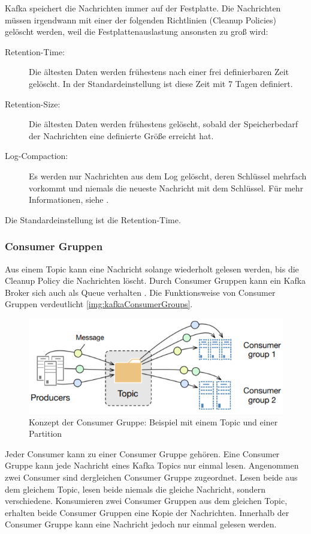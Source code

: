\documentclass[a4paper,titlepage,halfparskip,12pt]{scrreprt}
\begin{document}
\begin{onehalfspacing}
Kafka speichert die Nachrichten immer auf der Festplatte. Die Nachrichten müssen irgendwann mit einer der folgenden Richtlinien (Cleanup Policies) \cite{berleKafkaOverview} gelöscht werden, weil die Festplattenauslastung ansonsten zu groß wird:

\begin{description}
\item[Retention-Time:] Die ältesten Daten werden frühestens nach einer frei definierbaren Zeit gelöscht. In der Standardeinstellung ist diese Zeit mit 7 Tagen definiert.
\item[Retention-Size:] Die ältesten Daten werden frühestens gelöscht, sobald der Speicherbedarf der Nachrichten eine definierte Größe erreicht hat.
\item[Log-Compaction:] Es werden nur Nachrichten aus dem Log gelöscht, deren Schlüssel mehrfach vorkommt und niemals die neueste Nachricht mit dem Schlüssel. Für mehr Informationen, siehe \cite{kafkaLogCompaction}.
\end{description}

Die Standardeinstellung ist die Retention-Time.

\subsubsection*{Consumer Gruppen}

Aus einem Topic kann eine Nachricht solange wiederholt gelesen werden, bis die Cleanup Policy die Nachrichten löscht. Durch Consumer Gruppen kann ein Kafka Broker sich auch als Queue verhalten \cite{nannoniDissKafka}. Die Funktionsweise von Consumer Gruppen verdeutlicht \autoref{img:kafkaConsumerGroups}.

\begin{figure}[h]
	\centering
	\includegraphics[width=.8\textwidth]{images/kafkaConsumerGroups}
	\caption{Konzept der Consumer Gruppe: Beispiel mit einem Topic und einer Partition \cite{nannoniDissKafka}}
	\label{img:kafkaConsumerGroups}
\end{figure}

Jeder Consumer kann zu einer Consumer Gruppe gehören. Eine Consumer Gruppe kann jede Nachricht eines Kafka Topics nur einmal lesen. Angenommen zwei Consumer sind dergleichen Consumer Gruppe zugeordnet. Lesen beide aus dem gleichem Topic, lesen beide niemals die gleiche Nachricht, sondern verschiedene. Konsumieren zwei Consumer Gruppen aus dem gleichen Topic, erhalten beide Consumer Gruppen eine Kopie der Nachrichten. Innerhalb der Consumer Gruppe kann eine Nachricht jedoch nur einmal gelesen werden.\cite{berleKafkaOverview, nannoniDissKafka}


\end{onehalfspacing}
\end{document}
